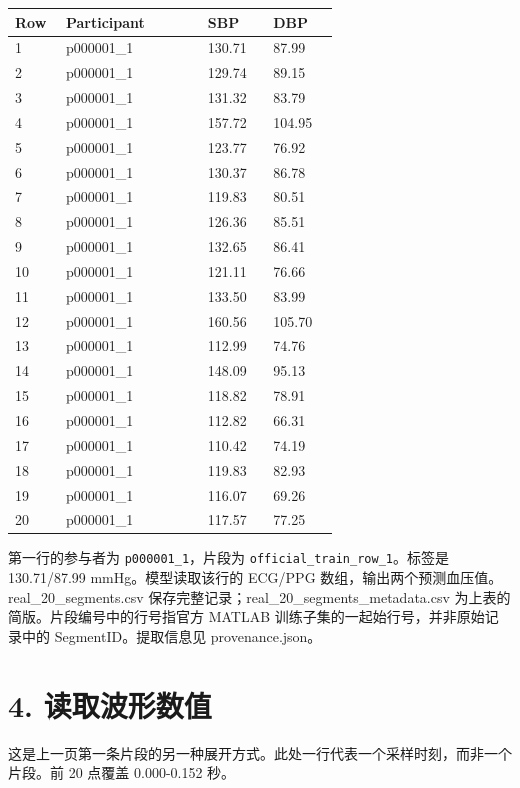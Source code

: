 \documentclass[11pt,letterpaper]{article}
\begin{document}
\par\smallskip
\begin{tabular}{@{}p{0.14\linewidth}p{0.39\linewidth}p{0.18\linewidth}p{0.18\linewidth}@{}}\toprule
Row & Participant & SBP & DBP\\\midrule
1 & p000001\_1 & 130.71 & 87.99\\
2 & p000001\_1 & 129.74 & 89.15\\
3 & p000001\_1 & 131.32 & 83.79\\
4 & p000001\_1 & 157.72 & 104.95\\
5 & p000001\_1 & 123.77 & 76.92\\
6 & p000001\_1 & 130.37 & 86.78\\
7 & p000001\_1 & 119.83 & 80.51\\
8 & p000001\_1 & 126.36 & 85.51\\
9 & p000001\_1 & 132.65 & 86.41\\
10 & p000001\_1 & 121.11 & 76.66\\
11 & p000001\_1 & 133.50 & 83.99\\
12 & p000001\_1 & 160.56 & 105.70\\
13 & p000001\_1 & 112.99 & 74.76\\
14 & p000001\_1 & 148.09 & 95.13\\
15 & p000001\_1 & 118.82 & 78.91\\
16 & p000001\_1 & 112.82 & 66.31\\
17 & p000001\_1 & 110.42 & 74.19\\
18 & p000001\_1 & 119.83 & 82.93\\
19 & p000001\_1 & 116.07 & 69.26\\
20 & p000001\_1 & 117.57 & 77.25\\
\bottomrule\end{tabular}\par\smallskip

第一行的参与者为 \texttt{p000001\_1}，片段为 \texttt{official\_train\_row\_1}。标签是 130.71/87.99 mmHg。模型读取该行的 ECG/PPG 数组，输出两个预测血压值。
real\_20\_segments.csv 保存完整记录；real\_20\_segments\_metadata.csv 为上表的简版。片段编号中的行号指官方 MATLAB 训练子集的一起始行号，并非原始记录中的 SegmentID。提取信息见 provenance.json。\newpage
\section*{4. 读取波形数值}
这是上一页第一条片段的另一种展开方式。此处一行代表一个采样时刻，而非一个片段。前 20 点覆盖 0.000-0.152 秒。
\end{document}
